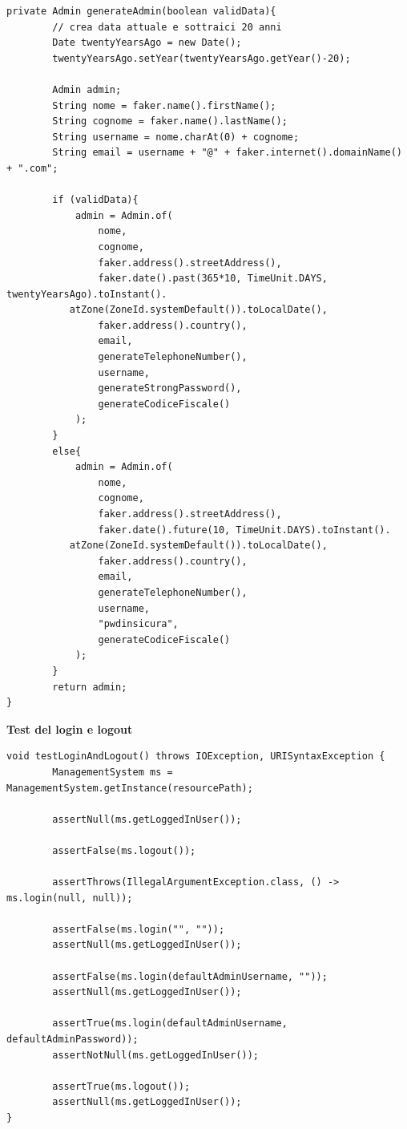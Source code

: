 \documentclass[ 4paper,11pt,openany]{book}
\begin{document}
\begin{lstlisting}[basicstyle=\small,xleftmargin=-0.5cm]
private Admin generateAdmin(boolean validData){
        // crea data attuale e sottraici 20 anni
        Date twentyYearsAgo = new Date();
        twentyYearsAgo.setYear(twentyYearsAgo.getYear()-20);

        Admin admin;
        String nome = faker.name().firstName();
        String cognome = faker.name().lastName();
        String username = nome.charAt(0) + cognome;
        String email = username + "@" + faker.internet().domainName() + ".com";

        if (validData){
            admin = Admin.of(
                nome,
                cognome,
                faker.address().streetAddress(),
                faker.date().past(365*10, TimeUnit.DAYS, twentyYearsAgo).toInstant().
		   atZone(ZoneId.systemDefault()).toLocalDate(),
                faker.address().country(),
                email,
                generateTelephoneNumber(),
                username,
                generateStrongPassword(),
                generateCodiceFiscale()
            );
        }
        else{
            admin = Admin.of(
                nome,
                cognome,
                faker.address().streetAddress(),
                faker.date().future(10, TimeUnit.DAYS).toInstant().
		   atZone(ZoneId.systemDefault()).toLocalDate(),
                faker.address().country(),
                email,
                generateTelephoneNumber(),
                username,
                "pwdinsicura",
                generateCodiceFiscale()
            );
        }
        return admin;
}
\end{lstlisting}
\textbf{Test del login e logout}
\begin{lstlisting}[basicstyle=\small,xleftmargin=-0.5cm]
void testLoginAndLogout() throws IOException, URISyntaxException {
        ManagementSystem ms = ManagementSystem.getInstance(resourcePath);

        assertNull(ms.getLoggedInUser());

        assertFalse(ms.logout());

        assertThrows(IllegalArgumentException.class, () -> ms.login(null, null));

        assertFalse(ms.login("", ""));
        assertNull(ms.getLoggedInUser());

        assertFalse(ms.login(defaultAdminUsername, ""));
        assertNull(ms.getLoggedInUser());

        assertTrue(ms.login(defaultAdminUsername, defaultAdminPassword));
        assertNotNull(ms.getLoggedInUser());

        assertTrue(ms.logout());
        assertNull(ms.getLoggedInUser());
}
\end{lstlisting}
\end{document}
